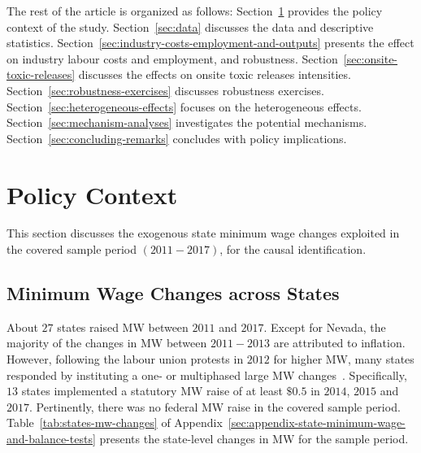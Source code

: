 \documentclass{C:/Users/david/OneDrive/Documents/ULMS/PhD/Thesis/chapter3/src/climate_change/latex/Economic_Journal/OUP-EJ}
\begin{document}
    The rest of the article is organized as follows: Section~\ref{sec:policy-context} provides the policy context of the study. Section~\ref{sec:data} discusses the data and descriptive statistics. Section~\ref{sec:industry-costs-employment-and-outputs} presents the effect on industry labour costs and employment, and robustness. Section~\ref{sec:onsite-toxic-releases} discusses the effects on onsite toxic releases intensities. Section~\ref{sec:robustness-exercises} discusses robustness exercises. Section~\ref{sec:heterogeneous-effects} focuses on the heterogeneous effects. Section~\ref{sec:mechanism-analyses} investigates the potential mechanisms. Section~\ref{sec:concluding-remarks} concludes with policy implications.


    \section{Policy Context}\label{sec:policy-context}
    This section discusses the exogenous state minimum wage changes exploited in the covered sample period $(2011-2017)$, for the causal identification.

    \subsection{Minimum Wage Changes across States}\label{subsec:minimum-wage-changes-across-states}
    About $27$ states raised MW between $2011$ and $2017$. Except for Nevada, the majority of the changes in MW between $2011-2013$ are attributed to inflation. However, following the labour union protests in $2012$ for higher MW, many states responded by instituting a one- or multiphased large MW changes~\citep{lathrop2021raises}. Specifically, $13$ states implemented a statutory MW raise of at least $\$0.5$ in $2014$, $2015$ and $2017$. Pertinently, there was no federal MW raise in the covered sample period. Table~\ref{tab:states-mw-changes} of Appendix~\ref{sec:appendix-state-minimum-wage-and-balance-tests} presents the state-level changes in MW for the sample period.
\end{document}
